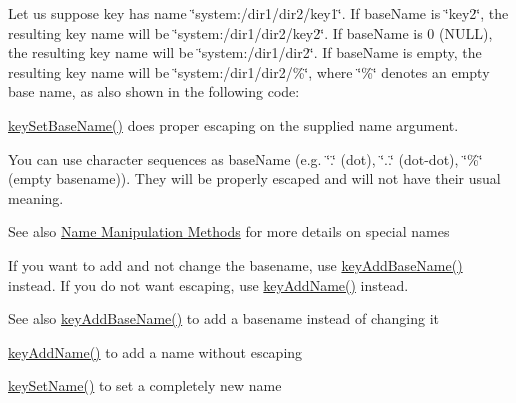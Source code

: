 Let us suppose {\ttfamily key} has name {\ttfamily \char`\"{}system\+:/dir1/dir2/key1\char`\"{}}. If {\ttfamily base\+Name} is {\ttfamily \char`\"{}key2\char`\"{}}, the resulting key name will be {\ttfamily \char`\"{}system\+:/dir1/dir2/key2\char`\"{}}. If {\ttfamily base\+Name} is 0 (N\+U\+LL), the resulting key name will be {\ttfamily \char`\"{}system\+:/dir1/dir2\char`\"{}}. If {\ttfamily base\+Name} is empty, the resulting key name will be {\ttfamily \char`\"{}system\+:/dir1/dir2/\%\char`\"{}}, where {\ttfamily \char`\"{}\%\char`\"{}} denotes an empty base name, as also shown in the following code\+:


 \hyperlink{group__keyname_ga6e804bd453f98c28b0ff51430d1df407}{key\+Set\+Base\+Name()} does proper escaping on the supplied name argument.

You can use character sequences as {\ttfamily base\+Name} (e.\+g. {\ttfamily \char`\"{}.\char`\"{}} (dot), {\ttfamily \char`\"{}..\char`\"{}} (dot-\/dot), {\ttfamily \char`\"{}\%\char`\"{}} (empty basename)). They will be properly escaped and will not have their usual meaning.

\begin{DoxySeeAlso}{See also}
\hyperlink{group__keyname}{Name Manipulation Methods} for more details on special names
\end{DoxySeeAlso}
If you want to add and not change the basename, use \hyperlink{group__keyname_gaa942091fc4bd5c2699e49ddc50829524}{key\+Add\+Base\+Name()} instead. If you do not want escaping, use \hyperlink{group__keyname_gaa70593a2c772c4b7bc33423b9b10a270}{key\+Add\+Name()} instead.

\begin{DoxySeeAlso}{See also}
\hyperlink{group__keyname_gaa942091fc4bd5c2699e49ddc50829524}{key\+Add\+Base\+Name()} to add a basename instead of changing it 

\hyperlink{group__keyname_gaa70593a2c772c4b7bc33423b9b10a270}{key\+Add\+Name()} to add a name without escaping 

\hyperlink{group__keyname_ga7699091610e7f3f43d2949514a4b35d9}{key\+Set\+Name()} to set a completely new name
\end{DoxySeeAlso}

